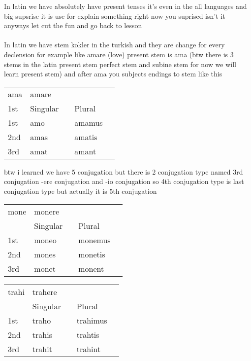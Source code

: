 In latin we have absolutely have present tenses it's even in the all languages
and big supsrise it is use for explain something right now you suprised isn't it anyways
let cut the fun and go back to lesson \\\\
In latin we have stem kokler in the turkish and 
they are change for every declension for example like amare (love) present stem is ama (btw
there is 3 stems in the latin present stem perfect stem and subine stem for now we will learn present stem)
and after ama you subjects endings to stem like this
\begin{center}  
  \begin{tabular}{lllll}
      ama & amare & & & \\
      1st  & Singular  &   & Plural & \\
      1st & amo  &  & amamus &  \\
      2nd & amas &  & amatis &  \\
      3rd & amat &  & amant  &  \\
  \end{tabular}
\end{center}
btw i learned we have 5 conjugation but there is 2 conjugation type
named 3rd conjugation -ere conjugation and -io conjugation so 
4th conjugation type is last conjugation type but actually it is 5th conjugation
\begin{center}  
  \begin{tabular}{lllll}
    mone & monere & & & \\
      & Singular  &   & Plural & \\
      1st & moneo  &  & monemus &  \\
      2nd & mones &  & monetis &  \\
      3rd & monet &  & monent  &  \\
  \end{tabular}
\end{center}

\begin{center}  
  \begin{tabular}{lllll}
      trahi & trahere & & & \\
          & Singular  &   & Plural & \\
      1st & traho  &  & trahimus &  \\
      2nd & trahis &  & trahtis &  \\
      3rd & trahit &  & trahint  &  \\
  \end{tabular}
\end{center}

